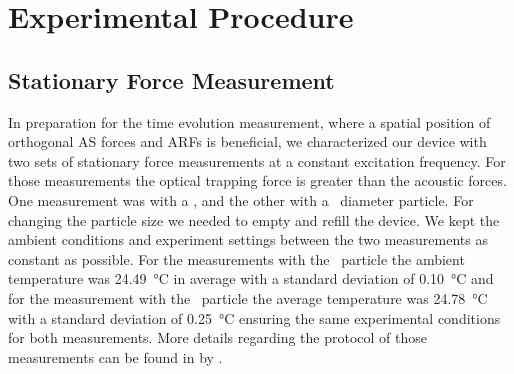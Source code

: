 \section{Experimental Procedure\label{sec:TC-experimental-procedure}}

\subsection{Stationary Force Measurement}
In preparation for the time evolution measurement, where a spatial position of 
orthogonal AS forces and ARFs is beneficial, we characterized our device with 
two sets of stationary force measurements at a constant excitation frequency. 
For those measurements the optical trapping force is greater than the acoustic 
forces. One measurement was with a \Dtwo, and the other with a \Dfour~diameter 
particle. For changing the particle size we needed to empty and refill the 
device.  We kept the ambient conditions and experiment settings between the two 
measurements as constant as possible. For the measurements with the 
\Dtwo~particle the ambient temperature was \SI{24.49}{\celsius} in average with 
a standard deviation of \SI{0.10}{\celsius} and for the measurement with the 
\Dfour~particle the average temperature was \SI{24.78}{\celsius} with a 
standard deviation of \SI{0.25}{\celsius} ensuring the same experimental 
conditions for both measurements. More details regarding the protocol of those 
measurements can be found in \cite{Lamprecht2016} by 
\citeauthor{Lamprecht2016}.


